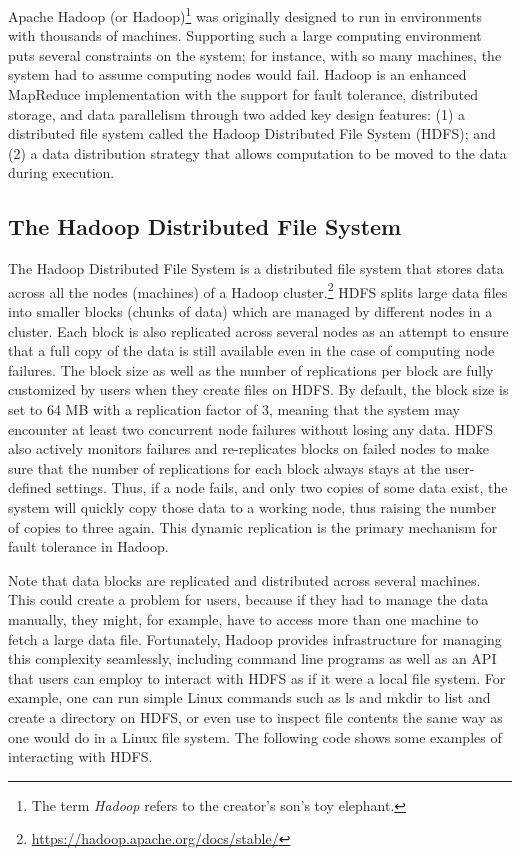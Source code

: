 \documentclass[]{krantz}
\begin{document}
Apache Hadoop (or Hadoop)\footnote{The term \emph{Hadoop} refers to the
  creator's son's toy elephant.} was originally designed to run in
environments with thousands of machines. Supporting such a large
computing environment puts several constraints on the system; for
instance, with so many machines, the system had to assume computing
nodes would fail. Hadoop is an enhanced MapReduce implementation with
the support for fault tolerance, distributed storage, and data
parallelism through two added key design features: (1) a distributed
file system called the Hadoop Distributed File System (HDFS); and (2) a
data distribution strategy that allows computation to be moved to the
data during execution.

\subsection{The Hadoop Distributed File
System}\label{the-hadoop-distributed-file-system}

The Hadoop Distributed File System \citep{HDFS} is a distributed file
system that stores data across all the nodes (machines) of a Hadoop
cluster.\footnote{\url{https://hadoop.apache.org/docs/stable/}} HDFS
splits large data files into smaller blocks (chunks of data) which are
managed by different nodes in a cluster. Each block is also replicated
across several nodes as an attempt to ensure that a full copy of the
data is still available even in the case of computing node failures. The
block size as well as the number of replications per block are fully
customized by users when they create files on HDFS. By default, the
block size is set to 64 MB with a replication factor of 3, meaning that
the system may encounter at least two concurrent node failures without
losing any data. HDFS also actively monitors failures and re-replicates
blocks on failed nodes to make sure that the number of replications for
each block always stays at the user-defined settings. Thus, if a node
fails, and only two copies of some data exist, the system will quickly
copy those data to a working node, thus raising the number of copies to
three again. This dynamic replication is the primary mechanism for fault
tolerance in Hadoop.

Note that data blocks are replicated and distributed across several
machines. This could create a problem for users, because if they had to
manage the data manually, they might, for example, have to access more
than one machine to fetch a large data file. Fortunately, Hadoop
provides infrastructure for managing this complexity seamlessly,
including command line programs as well as an API that users can employ
to interact with HDFS as if it were a local file system. For example,
one can run simple Linux commands such as ls and mkdir to list and
create a directory on HDFS, or even use to inspect file contents the
same way as one would do in a Linux file system. The following code
shows some examples of interacting with HDFS.
\end{document}
